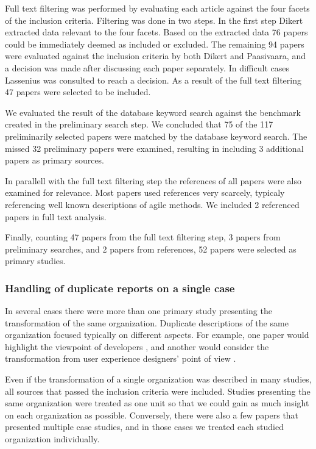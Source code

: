 \documentclass[preprint,authoryear,12pt]{elsarticle}
\begin{document}
Full text filtering was performed by evaluating each article against the four
facets of the inclusion criteria. Filtering was done in two steps. In the first
step Dikert extracted data relevant to the four facets. Based on the extracted
data 76 papers could be immediately deemed as included or excluded. The
remaining 94 papers were evaluated against the inclusion criteria by both Dikert
and Paasivaara, and a decision was made after discussing each paper separately.
In difficult cases Lassenius was consulted to reach a decision. As a result of
the full text filtering 47 papers were selected to be included.

We evaluated the result of the database keyword search against the benchmark
created in the preliminary search step. We concluded that 75 of the 117
preliminarily selected papers were matched by the database keyword search.
The missed 32 preliminary papers were examined, resulting in including 3
additional papers as primary sources.

In parallell with the full text filtering step the references of all papers were
also examined for relevance. Most papers used references very scarcely, typicaly
referencing well known descriptions of agile methods. We included 2 referenced
papers in full text analysis.

Finally, counting 47 papers from the full text filtering step, 3 papers from
preliminary searches, and 2 papers from references, 52 papers were selected
as primary studies.


\subsubsection{Handling of duplicate reports on a single case}

In several cases there were more than one primary study presenting the
transformation of the same organization. Duplicate descriptions of the same
organization focused typically on different aspects. For example, one paper
would highlight the viewpoint of developers \cite{Fry2007}, and another would
consider the transformation from user experience designers' point of view
\cite{Federoff2009}.

Even if the transformation of a single organization was described in many
studies, all sources that passed the inclusion criteria were included. Studies
presenting the same organization were treated as one unit so that we could gain
as much insight on each organization as possible. Conversely, there were also a
few papers that presented multiple case studies, and in those cases we treated
each studied organization individually.
\end{document}
